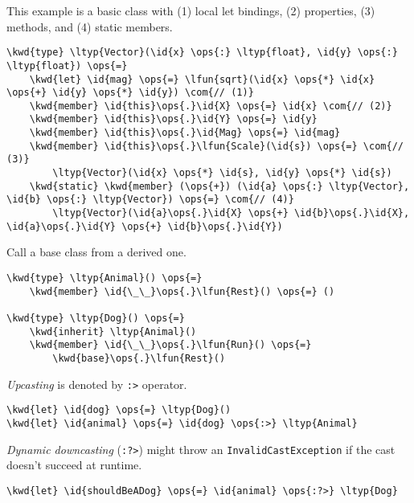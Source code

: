 \documentclass[10pt,landscape]{article}
\newcommand{\id}[1]{\textcolor[HTML]{000000}{#1}}
\newcommand{\kwd}[1]{\textcolor[HTML]{0000FF}{#1}}
\newcommand{\com}[1]{\textcolor[HTML]{008000}{#1}}
\newcommand{\ops}[1]{\textcolor[HTML]{000000}{#1}}
\newcommand{\ltyp}[1]{\textcolor[HTML]{2B91AF}{#1}}
\newcommand{\lfun}[1]{\textcolor[HTML]{AA5500}{#1}}
\begin{document}
\begin{multicols}{3}
This example is a basic class with (1) local let bindings, (2) properties, (3) methods, and (4) static members.
\begin{Verbatim}[commandchars=\\\{\}]
\kwd{type} \ltyp{Vector}(\id{x} \ops{:} \ltyp{float}, \id{y} \ops{:} \ltyp{float}) \ops{=}
    \kwd{let} \id{mag} \ops{=} \lfun{sqrt}(\id{x} \ops{*} \id{x} \ops{+} \id{y} \ops{*} \id{y}) \com{// (1)}
    \kwd{member} \id{this}\ops{.}\id{X} \ops{=} \id{x} \com{// (2)}
    \kwd{member} \id{this}\ops{.}\id{Y} \ops{=} \id{y}
    \kwd{member} \id{this}\ops{.}\id{Mag} \ops{=} \id{mag}
    \kwd{member} \id{this}\ops{.}\lfun{Scale}(\id{s}) \ops{=} \com{// (3)}
        \ltyp{Vector}(\id{x} \ops{*} \id{s}, \id{y} \ops{*} \id{s})
    \kwd{static} \kwd{member} (\ops{+}) (\id{a} \ops{:} \ltyp{Vector}, \id{b} \ops{:} \ltyp{Vector}) \ops{=} \com{// (4)}
        \ltyp{Vector}(\id{a}\ops{.}\id{X} \ops{+} \id{b}\ops{.}\id{X}, \id{a}\ops{.}\id{Y} \ops{+} \id{b}\ops{.}\id{Y})

\end{Verbatim}



Call a base class from a derived one.
\begin{Verbatim}[commandchars=\\\{\}]
\kwd{type} \ltyp{Animal}() \ops{=}
    \kwd{member} \id{\_\_}\ops{.}\lfun{Rest}() \ops{=} ()

\kwd{type} \ltyp{Dog}() \ops{=}
    \kwd{inherit} \ltyp{Animal}()
    \kwd{member} \id{\_\_}\ops{.}\lfun{Run}() \ops{=}
        \kwd{base}\ops{.}\lfun{Rest}()

\end{Verbatim}



\emph{Upcasting} is denoted by \texttt{:>} operator.
\begin{Verbatim}[commandchars=\\\{\}]
\kwd{let} \id{dog} \ops{=} \ltyp{Dog}() 
\kwd{let} \id{animal} \ops{=} \id{dog} \ops{:>} \ltyp{Animal}

\end{Verbatim}



\emph{Dynamic downcasting} (\texttt{:?>}) might throw an \texttt{InvalidCastException} if the cast doesn't succeed at runtime.
\begin{Verbatim}[commandchars=\\\{\}]
\kwd{let} \id{shouldBeADog} \ops{=} \id{animal} \ops{:?>} \ltyp{Dog}


\end{Verbatim}
\end{multicols}
\end{document}
